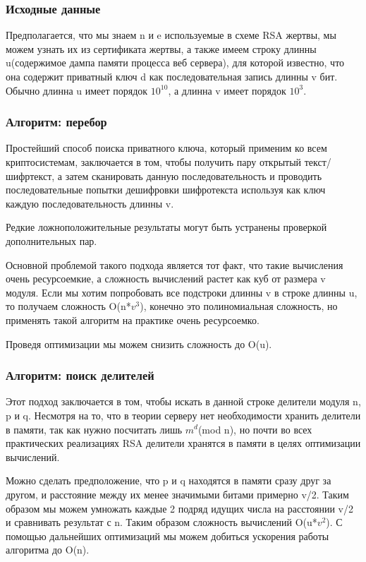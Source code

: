 \documentclass[20pt]{article}
\begin{document}
\subsubsection{Исходные данные}
Предполагается, что мы знаем n и e используемые в схеме RSA жертвы, мы можем
узнать их из сертификата жертвы, а также имеем строку длинны u(содержимое дампа
памяти процесса веб сервера), для которой известно, что она содержит приватный
ключ d как последовательная запись длинны v бит. Обычно длинна u имеет порядок
$10^10$, а длинна v имеет порядок $10^3$.

\subsubsection{Алгоритм: перебор}
Простейший способ поиска приватного ключа, который применим ко всем
криптосистемам, заключается в том, чтобы получить пару открытый текст/шифртекст,
а затем сканировать данную последовательность и проводить последовательные попытки
дешифровки шифротекста используя как ключ каждую последовательность длинны v.

Редкие ложноположительные результаты могут быть устранены проверкой
дополнительных пар.

Основной проблемой такого подхода является тот факт, что такие вычисления очень
ресурсоемкие, а сложность вычислений растет как куб от размера v модуля. Если мы
хотим попробовать все подстроки длинны v в строке длинны u, то получаем сложность
O(n*$v^3$), конечно это полиномиальная сложность, но применять такой алгоритм
на практике очень ресурсоемко.

Проведя оптимизации мы можем снизить сложность до O(u).

\subsubsection{Алгоритм: поиск делителей}
Этот подход заключается в том, чтобы искать в данной строке делители модуля n,
p и q. Несмотря на то, что в теории серверу нет необходимости хранить делители в
памяти, так как нужно посчитать лишь $m^d$(mod n), но почти во всех практических
реализациях RSA делители хранятся в памяти в целях оптимизации вычислений.

Можно сделать предположение, что p и q находятся в памяти сразу друг за другом,
и расстояние между их менее значимыми битами примерно v/2. Таким образом мы можем
умножать каждые 2 подряд идущих числа на расстоянии v/2 и сравнивать результат с
n. Таким образом сложность вычислений O(u*$v^2$). С помощью дальнейших оптимизаций
мы можем добиться ускорения работы алгоритма до O(n).
\end{document}
